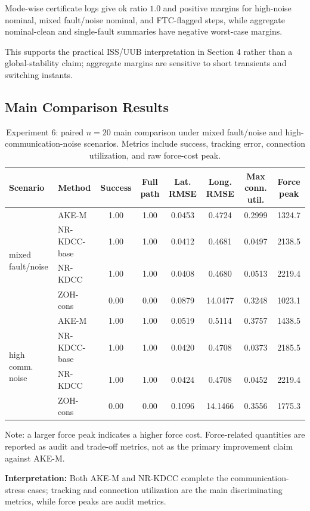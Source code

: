 \documentclass[letterpaper,journal]{IEEEtran}
\newcommand{\AKE}{AKE-M}
\newcommand{\Method}{NR-KDCC}
\newcommand{\MethodBase}{NR-KDCC-base}
\newcommand{\ZOHcons}{ZOH-cons}
\newcommand{\TF}{\Method{}}
\begin{document}
Mode-wise certificate logs give ok ratio $1.0$ and positive margins for high-noise nominal, mixed fault/noise nominal, and FTC-flagged steps, while aggregate nominal-clean and single-fault summaries have negative worst-case margins.

This supports the practical ISS/UUB interpretation in Section 4 rather than a global-stability claim; aggregate margins are sensitive to short transients and switching instants.

\subsection{Main Comparison Results}

\begin{table}[!t]
\centering
\caption{Experiment 6: paired $n=20$ main comparison under mixed fault/noise and high-communication-noise scenarios. Metrics include success, tracking error, connection utilization, and raw force-cost peak.}
\label{tab:e0_main}
\scriptsize
\begin{tabular}{llcccccc}
\toprule
Scenario & Method & Success & Full path & Lat. RMSE & Long. RMSE & Max conn. util. & Force peak \\
\midrule
\multirow{4}{*}{mixed fault/noise}
& \AKE{} & 1.00 & 1.00 & 0.0453 & 0.4724 & 0.2999 & 1324.7\\
& \MethodBase{} & 1.00 & 1.00 & 0.0412 & 0.4681 & 0.0497 & 2138.5\\
& \TF{} & 1.00 & 1.00 & 0.0408 & 0.4680 & 0.0513 & 2219.4\\
& \ZOHcons{} & 0.00 & 0.00 & 0.0879 & 14.0477 & 0.3248 & 1023.1\\
\midrule
\multirow{4}{*}{high comm. noise}
& \AKE{} & 1.00 & 1.00 & 0.0519 & 0.5114 & 0.3757 & 1438.5\\
& \MethodBase{} & 1.00 & 1.00 & 0.0420 & 0.4708 & 0.0373 & 2185.5\\
& \TF{} & 1.00 & 1.00 & 0.0424 & 0.4708 & 0.0452 & 2219.4\\
& \ZOHcons{} & 0.00 & 0.00 & 0.1096 & 14.1466 & 0.3556 & 1775.3\\
\bottomrule
\end{tabular}
\begin{tablenotes}
\footnotesize
\item Note: a larger force peak indicates a higher force cost. Force-related quantities are reported as audit and trade-off metrics, not as the primary improvement claim against \AKE{}.
\end{tablenotes}
\vspace{1.5mm}
\begin{minipage}{0.93\textwidth}
\footnotesize
\textbf{Interpretation:} Both \AKE{} and \Method{} complete the communication-stress cases; tracking and connection utilization are the main discriminating metrics, while force peaks are audit metrics.
\end{minipage}
\end{table}
\end{document}

